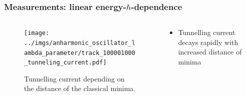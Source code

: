 \documentclass[aspectratio=169]{beamer}
\begin{document}
\begin{frame}
	\frametitle{Measurements: linear energy-$\hbar$-dependence}
	\vspace{-15px}
	\begin{columns}
		\begin{column}{0.6\textwidth}
			\begin{figure}[H]
				\centering
				\texttt{[image: ../imgs/anharmonic\_oscillator\_lambda\_parameter/track\_100001000\_tunneling\_current.pdf]}
				\caption{Tunnelling current depending on the distance of the classical minima.}
				\label{fig:anharmonic_oscillator_tunneling_current}
			\end{figure}
		\end{column}
		\begin{column}{0.39\textwidth}
			\begin{itemize}
				\item Tunnelling current decays rapidly with increased distance of minima
			\end{itemize}
		\end{column}
	\end{columns}
\end{frame}
\end{document}
